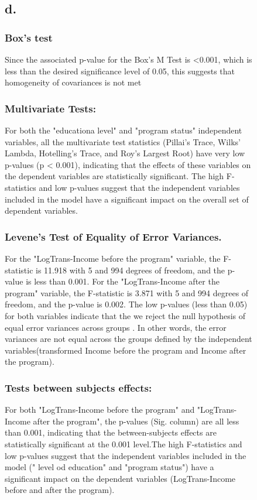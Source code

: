 \documentclass[english,10pt,a4paper]{article}
\begin{document}
			
		
	\begin{figure}[h]		
	\subsection*{d.}	
	
	\subsubsection*{Box's test}	
	Since the associated p-value for the Box’s M Test is <0.001, which is less than the desired significance level of 0.05, this suggests that homogeneity of covariances is not met
	
		\subsubsection*{Multivariate Tests:}
	For both the "educationa level" and "program status" independent variables, all the multivariate test statistics (Pillai's Trace, Wilks' Lambda, Hotelling's Trace, and Roy's Largest Root) have very low p-values (p < 0.001), indicating that the effects of these variables on the dependent variables are statistically significant.
	The high F-statistics and low p-values suggest that the independent variables included in the model have a significant impact on the overall set of dependent variables.
	
	\subsubsection*{Levene's Test of Equality of Error Variances.}
	For the "LogTrans-Income before the program" variable, the F-statistic is 11.918 with 5 and 994 degrees of freedom, and the p-value is less than 0.001.
	For the "LogTrans-Income after the program" variable, the F-statistic is 3.871 with 5 and 994 degrees of freedom, and the p-value is 0.002.
	The low p-values (less than 0.05) for both variables indicate that the we reject the null hypothesis of equal error variances across groups . In other words, the error variances are not equal across the groups defined by the independent variables(transformed Income
	before the program and Income after the program).
	
	\subsubsection*{Tests between subjects effects:}	
	For both "LogTrans-Income before the program" and "LogTrans-Income after the program", the p-values (Sig. column) are all less than 0.001, indicating that the between-subjects effects are statistically significant at the 0.001 level.The high F-statistics and low p-values suggest that the independent variables included in the model (" level od education" and "program status") have a significant impact on the dependent variables (LogTrans-Income before and after the program).
	

\end{figure}
\end{document}
